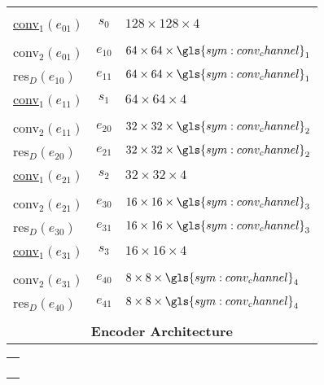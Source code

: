 \begin{center}
\begin{minipage}{0.4\textwidth}
\begin{tabular}{l|c|l}
			&&                                                       \\
			\underline{conv}$_1(e_{01})$ & $s_0$ & $128 \times 128 \times 4$ \\
			&&                                                   \\
			\hline
			conv$_2(e_{01})$ & $e_{10}$ & $64 \times 64 \times \gls{sym:conv_channel}_1$\\
			res$_D(e_{10})$ & $e_{11}$ & $64 \times 64 \times \gls{sym:conv_channel}_1$ \\
			\underline{conv}$_1(e_{11})$ & $s_1$ & $64 \times 64 \times 4$ \\
			&&                                                 \\
			\hline
			conv$_2(e_{11})$ & $e_{20}$ & $32 \times 32 \times \gls{sym:conv_channel}_2$\\
			res$_D(e_{20})$ & $e_{21}$ & $32 \times 32 \times \gls{sym:conv_channel}_2$ \\
			\underline{conv}$_1(e_{21})$ & $s_2$ & $32 \times 32 \times 4$ \\
			&&                                                 \\
			\hline
			conv$_2(e_{21})$ & $e_{30}$ & $16 \times 16 \times \gls{sym:conv_channel}_3$\\
			res$_D(e_{30})$ & $e_{31}$ & $16 \times 16 \times \gls{sym:conv_channel}_3$ \\
			\underline{conv}$_1(e_{31})$ & $s_3$ & $16 \times 16 \times 4$ \\
			&&                                                 \\
			\hline
			conv$_2(e_{31})$ & $e_{40}$ & $8 \times 8 \times \gls{sym:conv_channel}_4$\\
			res$_D(e_{40})$ & $e_{41}$ & $8 \times 8 \times \gls{sym:conv_channel}_4$ \\
			\multicolumn{3}{c}{}             \\
			\multicolumn{3}{c}{\textbf{Encoder Architecture}}             \\
		\end{tabular}
	\end{minipage}
	\hfill
	\begin{minipage}{0.02\textwidth}
		\centering
		\begin{tabular}{c}
			\\		
			\\		
			\\	
			\\	
			\\

\end{tabular}
\end{minipage}
\end{center}
